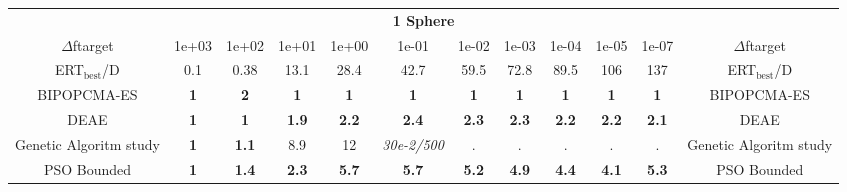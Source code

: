 \begin{tabular}{cccccccccccc}
 & \multicolumn{10}{c}{{\normalsize \textbf{1 Sphere}}}\\
$\Delta$ftarget& 1e+03& 1e+02& 1e+01& 1e+00& 1e-01& 1e-02& 1e-03& 1e-04& 1e-05& 1e-07 & $\Delta$ftarget \\
ERT$_{\textrm{best}}$/D& 0.1& 0.38& 13.1& 28.4& 42.7& 59.5& 72.8& 89.5& 106& 137 & ERT$_{\textrm{best}}$/D \\
\hline
BIPOPCMA-ES & \textbf{1} & \textbf{2} & \textbf{1} & \textbf{1} & \textbf{1} & \textbf{1} & \textbf{1} & \textbf{1} & \textbf{1} & \textbf{1} & BIPOPCMA-ES \cite{add_an_entry_for_BIPOPCMA-ES_in_bbob.bib}\\
DEAE & \textbf{1} & \textbf{1} & \textbf{1.9} & \textbf{2.2} & \textbf{2.4} & \textbf{2.3} & \textbf{2.3} & \textbf{2.2} & \textbf{2.2} & \textbf{2.1} & DEAE \cite{add_an_entry_for_DEAE_in_bbob.bib}\\
Genetic Algoritm study & \textbf{1} & \textbf{1.1} & 8.9 & 12 & \textit{30e-2}\textit{/500} & . & . & . & . & . & Genetic Algoritm study \cite{add_an_entry_for_Genetic Algoritm study_in_bbob.bib}\\
PSO Bounded & \textbf{1} & \textbf{1.4} & \textbf{2.3} & \textbf{5.7} & \textbf{5.7} & \textbf{5.2} & \textbf{4.9} & \textbf{4.4} & \textbf{4.1} & \textbf{5.3} & PSO Bounded \cite{add_an_entry_for_PSO Bounded_in_bbob.bib}
\end{tabular}
